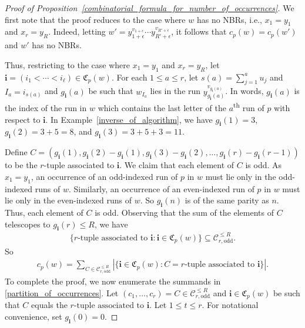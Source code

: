 \documentclass[10pt,a4paper]{amsart}
\begin{document}
\begin{proof}[Proof of Proposition~\ref{combinatorial_formula_for_number_of_occurrences}]
    We first note that the proof reduces to the case where $w$ has no NBRs, i.e., $x_1=y_1$ and $x_r=y_R$. Indeed, letting $w'=y_{1+\epsilon}^{v_{1+\epsilon}}\cdots y_{R'+\epsilon}^{v_{R'+\epsilon}}$, it follows that $c_p(w)=c_p(w')$ and $w'$ has no NBRs.
    
    Thus, restricting to the case where $x_1=y_1$ and $x_r=y_R$, let $\mathbf{i}=(i_1<\cdots<i_{\ell})\in\mathfrak{C}_p(w)$. For each $1\leq a\leq r$, let $s(a)=\sum_{j=1}^{a}u_j$ and $I_a=i_{s(a)}$ and $g_{\mathbf{i}}(a)$ be such that $w_{I_a}$ lies in the run $y_{g_{\mathbf{i}}(a)}^{v_{g_{\mathbf{i}}(a)}}$. In words, $g_{\mathbf{i}}(a)$ is the index of the run in $w$ which contains the last letter of the $a$\textsuperscript{th} run of $p$ with respect to $\mathbf{i}$. In Example~\ref{inverse_of_algorithm}, we have $g_{\mathbf{i}}(1)=3$, $g_{\mathbf{i}}(2)=3+5=8$, and $g_{\mathbf{i}}(3)=3+5+3=11$. 
    
    Define $C=(g_{\mathbf{i}}(1),g_{\mathbf{i}}(2)-g_{\mathbf{i}}(1),g_{\mathbf{i}}(3)-g_{\mathbf{i}}(2),\dots,g_{\mathbf{i}}(r)-g_{\mathbf{i}}(r-1))$ to be the $r$-tuple associated to $\mathbf{i}$. We claim that each element of $C$ is odd. As $x_1=y_1$, an occurrence of an odd-indexed run of $p$ in $w$ must lie only in the odd-indexed runs of $w$. Similarly, an occurrence of an even-indexed run of $p$ in $w$ must lie only in the even-indexed runs of $w$. So $g_{\mathbf{i}}(n)$ is of the same parity as $n$. Thus, each element of $C$ is odd. Observing that the sum of the elements of $C$ telescopes to $g_{\mathbf{i}}(r)\leq R$, we have
    \begin{align*}
        \{r\text{-tuple~associated~to~}\mathbf{i}:\mathbf{i}\in\mathfrak{C}_{p}(w)\}\subseteq\mathscr{C}_{r,\text{odd}}^{\leq R}.
    \end{align*}
    So
    \begin{align}\label{partition_of_occurrences}
        c_p(w)=\sum_{C\in\mathscr{C}_{r,\text{odd}}^{\leq R}}\left|\{\mathbf{i}\in\mathfrak{C}_{p}(w):C=r\text{-tuple~associated~to~}\mathbf{i}\}\right|.
    \end{align}
    To complete the proof, we now enumerate the summands in \eqref{partition_of_occurrences}. Let $(c_1,\dots,c_r)=C\in \mathscr{C}_{r,\text{odd}}^{\leq R}$ and $\mathbf{i}\in\mathfrak{C}_{p}(w)$ be such that $C$ equals the $r\text{-tuple associated to }\mathbf{i}$. Let $1\leq t\leq r$. For notational convenience, set $g_{\mathbf{i}}(0)=0$. 
    

\end{proof}
\end{document}
